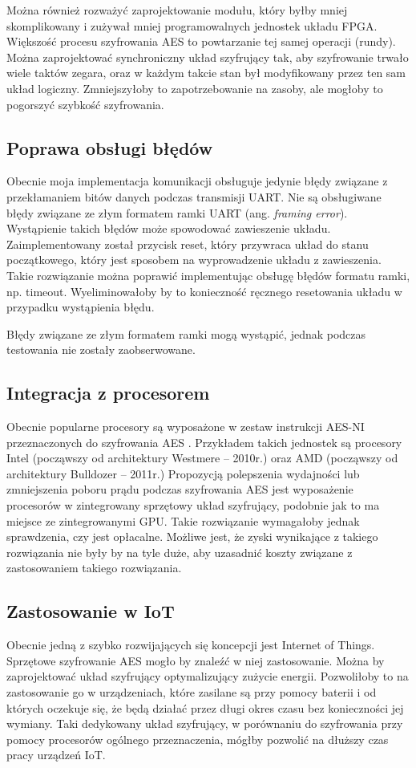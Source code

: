 Można również rozważyć zaprojektowanie modułu, który byłby mniej skomplikowany i zużywał mniej programowalnych jednostek układu FPGA. Większość procesu szyfrowania AES to powtarzanie tej samej operacji (rundy). Można zaprojektować synchroniczny układ szyfrujący tak, aby szyfrowanie trwało wiele taktów zegara, oraz w każdym takcie stan był modyfikowany przez ten sam układ logiczny. Zmniejszyłoby to zapotrzebowanie na zasoby, ale mogłoby to pogorszyć szybkość szyfrowania.

\subsection{Poprawa obsługi błędów}
Obecnie moja implementacja komunikacji obsługuje jedynie błędy związane z przekłamaniem bitów danych podczas transmisji UART. Nie są obsługiwane błędy związane ze złym formatem ramki UART (ang. \textit{framing error}). Wystąpienie takich błędów może spowodować zawieszenie układu. Zaimplementowany został przycisk reset, który przywraca układ do stanu początkowego, który jest sposobem na wyprowadzenie układu z zawieszenia. Takie rozwiązanie można poprawić implementując obsługę błędów formatu ramki, np. timeout. Wyeliminowałoby by to konieczność ręcznego resetowania układu w przypadku wystąpienia błędu.

Błędy związane ze złym formatem ramki mogą wystąpić, jednak podczas testowania nie zostały zaobserwowane.

\subsection{Integracja z procesorem}
Obecnie popularne procesory są wyposażone w zestaw instrukcji AES-NI przeznaczonych do szyfrowania AES \cite{aes-processors}. Przykładem takich jednostek są procesory Intel (począwszy od architektury Westmere -- 2010r.) oraz AMD (począwszy od architektury Bulldozer -- 2011r.) Propozycją polepszenia wydajności lub zmniejszenia poboru prądu podczas szyfrowania AES jest wyposażenie procesorów w zintegrowany sprzętowy układ szyfrujący, podobnie jak to ma miejsce ze zintegrowanymi GPU. Takie rozwiązanie wymagałoby jednak sprawdzenia, czy jest opłacalne. Możliwe jest, że zyski wynikające z takiego rozwiązania nie były by na tyle duże, aby uzasadnić koszty związane z zastosowaniem takiego rozwiązania.

\subsection{Zastosowanie w IoT}
Obecnie jedną z szybko rozwijających się koncepcji jest Internet of Things. Sprzętowe szyfrowanie AES mogło by znaleźć w niej zastosowanie. Można by zaprojektować układ szyfrujący optymalizujący zużycie energii. Pozwoliłoby to na zastosowanie go w urządzeniach, które zasilane są przy pomocy baterii i od których oczekuje się, że będą działać przez długi okres czasu bez konieczności jej wymiany. Taki dedykowany układ  szyfrujący, w porównaniu do szyfrowania przy pomocy procesorów ogólnego przeznaczenia, mógłby pozwolić na dłuższy czas pracy urządzeń IoT.